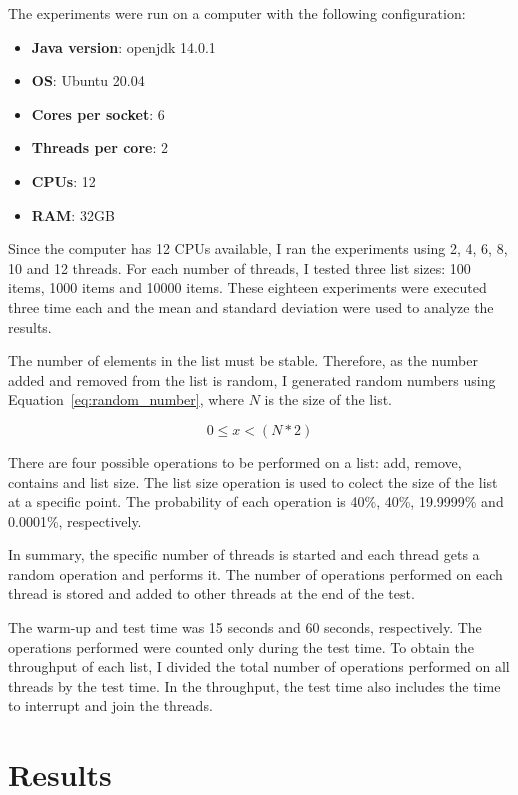 \documentclass{article}
\begin{document}
The experiments were run on a computer with the following configuration:

\begin{itemize}
    \item \textbf{Java version}: openjdk 14.0.1
    \item \textbf{OS}: Ubuntu 20.04
    \item \textbf{Cores per socket}: 6
    \item \textbf{Threads per core}: 2
    \item \textbf{CPUs}: 12
    \item \textbf{RAM}: 32GB
\end{itemize}

Since the computer has 12 CPUs available, I ran the experiments using 2, 4, 6, 8, 10 and 12 threads. For each number of threads, I tested three list sizes: 100 items, 1000 items and 10000 items. These eighteen experiments were executed three time each and the mean and standard deviation were used to analyze the results.

The number of elements in the list must be stable. Therefore, as the number added and removed from the list is random, I generated random numbers using Equation~\ref{eq:random_number}, where $N$ is the size of the list.

\begin{equation} \label{eq:random_number}
    0 \leq x < (N * 2)
\end{equation}

There are four possible operations to be performed on a list: add, remove, contains and list size. The list size operation is used to colect the size of the list at a specific point. The probability of each operation is 40\%, 40\%, 19.9999\% and 0.0001\%, respectively.

In summary, the specific number of threads is started and each thread gets a random operation and performs it. The number of operations performed on each thread is stored and added to other threads at the end of the test.

The warm-up and test time was 15 seconds and 60 seconds, respectively. The operations performed were counted only during the test time. To obtain the throughput of each list, I divided the total number of operations performed on all threads by the test time. In the throughput, the test time also includes the time to interrupt and join the threads.


\section{Results} \label{section:results}
\end{document}
